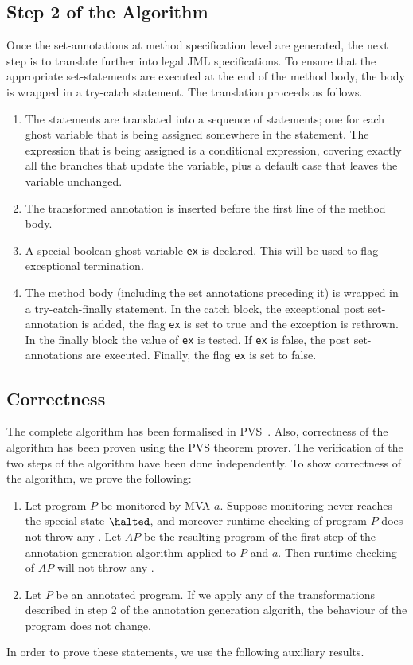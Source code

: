 \subsection{Step 2 of the Algorithm}
Once the set-annotations at method specification level are generated,
the next step is to translate further into legal JML
specifications. To ensure that the appropriate set-statements are
executed at the end of the method body, the body is wrapped in a
try-catch statement. The translation proceeds as follows.
\begin{enumerate}
\item The \CaseJML statements are translated into a sequence of \Set
statements; one for each ghost variable that is being assigned
somewhere in the \CaseJML statement. The expression that is being
assigned is a conditional expression, covering exactly all the
branches that update the variable, plus a default case that leaves the
variable unchanged.
\item The transformed \preset annotation is inserted before the first
line of the method body.
\item A special boolean ghost variable \texttt{ex} is declared. This
will be used to flag exceptional termination.
\item The method body (including the set annotations preceding it) is
wrapped in a try-catch-finally statement. In the catch block, the
exceptional post set-annotation is added, the flag \texttt{ex} is set
to true and the exception is rethrown. In the finally block the value
of \texttt{ex} is tested. If \texttt{ex} is false, the post
set-annotations are executed. Finally, the flag \texttt{ex} is set to
false.  
\end{enumerate}



\subsection{Correctness}

The complete algorithm has been formalised in
PVS~\cite{OwreRRSS96}. Also, correctness of the algorithm has been
proven using the PVS theorem prover. The verification of the two steps
of the algorithm have been done independently. To show correctness of
the algorithm, we prove the following:
\begin{enumerate}
\item Let program \(P\) be monitored by MVA \(a\). Suppose monitoring never
reaches the special state \(\halted\), and moreover runtime checking
of program \(P\) does not throw any \JMLExc. Let \(AP\) be the
resulting program of the first step of the annotation generation
algorithm applied to \(P\) and \(a\). Then runtime checking of \(AP\)
will not throw any \JMLExc.
\item Let \(P\) be an annotated program. If we apply any of the
transformations described in step 2 of the annotation generation
algorith, the behaviour of the program does not change.
\end{enumerate}
In order to prove these statements, we use the following auxiliary results.
